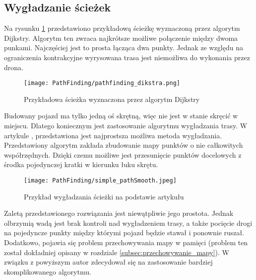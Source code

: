             \subsection{Wygładzanie ścieżek}
            \label{subsec:wygładzanie_ścieżek}
            Na rysunku \ref{fig:pathfinding_dikstra} przedstawiono przykładową ścieżkę wyznaczoną przez algorytm Dijkstry.
            Algorytm ten zwraca najkrótsze możliwe połączenie między dwoma punkami.
            Najczęściej jest to prosta łącząca dwa punkty.
            Jednak ze względu na ograniczenia kontrakcyjne wyrysowana trasa jest niemożliwa do wykonania przez drona.

            \begin{figure}[!ht]
                \centering
                \texttt{[image: PathFinding/pathfinding\_dikstra.png]}
                \caption{Przykładowa ścieżka wyznaczona przez algorytm Dijkstry}
                \label{fig:pathfinding_dikstra}
            \end{figure}

            Budowany pojazd ma tylko jedną oś skrętną, więc nie jest w stanie skręcić w miejscu.
            Dlatego koniecznym jest zastosowanie algorytmu wygładzania trasy.
            W artykule  \cite{Simple_PathSmoothing}, przedstawiona jest najprostsza możliwa metoda wygładzania.
            Przedstawiony algorytm zakłada zbudowanie mapy punktów o nie całkowitych współrzędnych.
            Dzięki czemu możliwe jest przesunięcie punktów docelowych z środka pojedynczej kratki w kierunku łuku skrętu.

            \begin{figure}[!ht]
                \centering
                \texttt{[image: PathFinding/simple\_pathSmooth.jpeg]}
                \caption{Przykład wygładzania ścieżki na podstawie artykułu}
                 \cite{Simple_PathSmoothing}
                \label{fig:simple_pathSmooth}
            \end{figure}

            Zaletą przedstawionego rozwiązania jest niewątpliwie jego prostota.
            Jednak olbrzymią wadą    jest brak kontroli nad wygładzeniem trasy, a także pocięcie drogi na pojedyncze punkty między którymi pojazd będzie stawał i ponownie ruszał.
            Dodatkowo, pojawia się problem przechowywania mapy w pamięci (problem ten został dokładniej opisany w rozdziale \ref{subsec:przechowywanie_mapy}).
            W związku z powyższym autor zdecydował się na zastosowanie bardziej skomplikowanego algorytmu.

